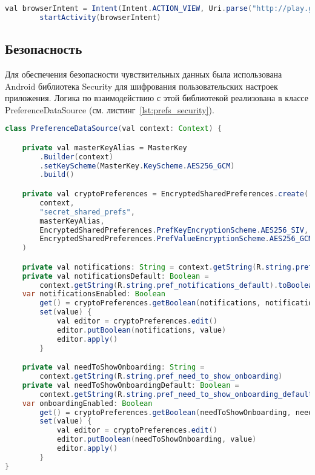 \begin{lstlisting}[language=Java,label={lst:prefs_intent},caption={browserIntent}]
        val browserIntent = Intent(Intent.ACTION_VIEW, Uri.parse("http://play.google.com/store/apps/dev?id=areyanainc"))
        startActivity(browserIntent)
\end{lstlisting}

\subsection{Безопасность}
Для обеспечения безопасности чувствительных данных была использована Android библиотека Security для шифрования пользовательских настроек приложения. Логика по взаимодействию с этой библиотекой реализована в классе PreferenceDataSource (см. листинг~\ref{lst:prefs_security}).

\begin{lstlisting}[language=Java,label={lst:prefs_security},caption={PreferenceDataSource}]
class PreferenceDataSource(val context: Context) {

    private val masterKeyAlias = MasterKey
        .Builder(context)
        .setKeyScheme(MasterKey.KeyScheme.AES256_GCM)
        .build()

    private val cryptoPreferences = EncryptedSharedPreferences.create(
        context,
        "secret_shared_prefs",
        masterKeyAlias,
        EncryptedSharedPreferences.PrefKeyEncryptionScheme.AES256_SIV,
        EncryptedSharedPreferences.PrefValueEncryptionScheme.AES256_GCM
    )

    private val notifications: String = context.getString(R.string.pref_notifications)
    private val notificationsDefault: Boolean =
        context.getString(R.string.pref_notifications_default).toBoolean()
    var notificationsEnabled: Boolean
        get() = cryptoPreferences.getBoolean(notifications, notificationsDefault)
        set(value) {
            val editor = cryptoPreferences.edit()
            editor.putBoolean(notifications, value)
            editor.apply()
        }

    private val needToShowOnboarding: String =
        context.getString(R.string.pref_need_to_show_onboarding)
    private val needToShowOnboardingDefault: Boolean =
        context.getString(R.string.pref_need_to_show_onboarding_default).toBoolean()
    var onboardingEnabled: Boolean
        get() = cryptoPreferences.getBoolean(needToShowOnboarding, needToShowOnboardingDefault)
        set(value) {
            val editor = cryptoPreferences.edit()
            editor.putBoolean(needToShowOnboarding, value)
            editor.apply()
        }
}
\end{lstlisting}

